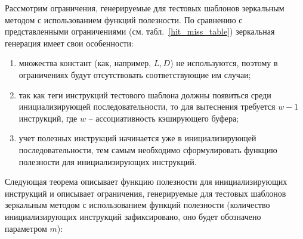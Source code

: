 Рассмотрим ограничения, генерируемые для тестовых шаблонов
зеркальным методом с использованием функций полезности. По сравнению
с представленными ограничениями (см. табл.~\ref{hit_miss_table})
зеркальная генерация имеет свои особенности:
\begin{enumerate}
  \item множества констант (как, например, $L, D$) не используются,
  поэтому в ограничениях будут отсутствовать соответствующие им
  случаи;
  \item так как теги инструкций тестового шаблона должны появиться
  среди инициализирующей последовательности, то для вытеснения
  требуется $w-1$ инструкций, где $w$ -- ассоциативность кэширующего буфера;
  \item учет полезных инструкций начинается уже в инициализирующей
  последовательности, тем самым необходимо сформулировать функцию
  полезности для инициализирующих инструкций.
\end{enumerate}

Следующая теорема описывает функцию полезности для инициализирующих
инструкций и описывает ограничения, генерируемые для тестовых
шаблонов зеркальным методом с использованием функций полезности
(количество инициализирующих инструкций зафиксировано, оно будет
обозначено параметром $m$):

